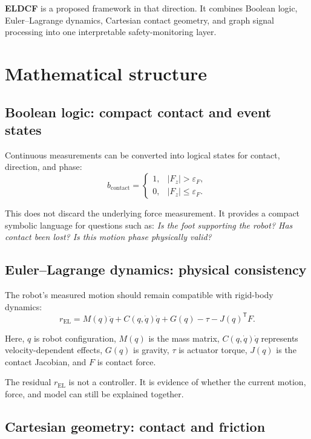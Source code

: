 \documentclass[11pt]{article}
\begin{document}
\textbf{ELDCF} is a proposed framework in that direction. It combines Boolean logic, Euler--Lagrange dynamics, Cartesian contact geometry, and graph signal processing into one interpretable safety-monitoring layer.

\section{Mathematical structure}

\subsection{Boolean logic: compact contact and event states}

Continuous measurements can be converted into logical states for contact, direction, and phase:
\[
b_{\mathrm{contact}} =
\begin{cases}
1, & \lvert F_z \rvert > \varepsilon_F, \\
0, & \lvert F_z \rvert \leq \varepsilon_F.
\end{cases}
\]

This does not discard the underlying force measurement. It provides a compact symbolic language for questions such as: \emph{Is the foot supporting the robot? Has contact been lost? Is this motion phase physically valid?}

\subsection{Euler--Lagrange dynamics: physical consistency}

The robot's measured motion should remain compatible with rigid-body dynamics:
\[
r_{\mathrm{EL}} =
M(q)\ddot{q}
+ C(q,\dot{q})\dot{q}
+ G(q)
- \tau
- J(q)^{\mathsf{T}}F.
\]

Here, $q$ is robot configuration, $M(q)$ is the mass matrix, $C(q,\dot{q})\dot{q}$ represents velocity-dependent effects, $G(q)$ is gravity, $\tau$ is actuator torque, $J(q)$ is the contact Jacobian, and $F$ is contact force.

The residual $r_{\mathrm{EL}}$ is not a controller. It is evidence of whether the current motion, force, and model can still be explained together.

\subsection{Cartesian geometry: contact and friction}
\end{document}
